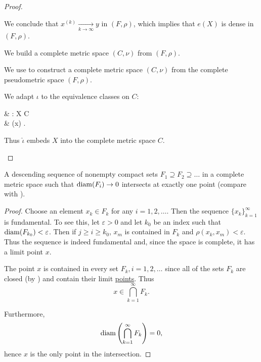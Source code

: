 \begin{proof}
\begin{thmenum}
    We conclude that \( x^{(k)} \xrightarrow[k \to \infty]{} y \) in \( (F, \rho) \), which implies that \( e(X) \) is dense in \( (F, \rho) \).

     We build a complete metric space \( (C, \nu) \) from \( (F, \rho) \).

    We use  to construct a complete metric space \( (C, \nu) \) from the complete pseudometric space \( (F, \rho) \).

    We adapt \( \iota \) to the equivalence classes on \( C \):
    \begin{balign*}
       & \hat\iota: X \to C                 \\
       & \hat\iota(x) \coloneqq [\iota(x)].
    \end{balign*}

    Thus \( \hat\iota \) embeds \( X \) into the complete metric space \( C \).
  \end{thmenum}
\end{proof}

\begin{theorem}\label{thm:cantors_nested_compact_theorem}
  A descending sequence of nonempty compact sets \( F_1 \supseteq F_2 \supseteq \ldots \) in a complete metric space such that \( \operatorname{diam}(F_i) \to 0 \) intersects at exactly one point (compare with ).
\end{theorem}
\begin{proof}
  Choose an element \( x_k \in F_k \) for any \( i = 1, 2, \ldots \). Then the sequence \( \{ x_k \}_{k=1}^\infty \) is fundamental. To see this, let \( \varepsilon > 0 \) and let \( k_0 \) be an index such that \( \operatorname{diam}(F_{k_0}) < \varepsilon \). Then if \( j \geq i \geq k_0 \), \( x_m \) is contained in \( F_k \) and \( \rho(x_k, x_m) < \varepsilon \). Thus the sequence is indeed fundamental and, since the space is complete, it has a limit point \( x \).

  The point \( x \) is contained in every set \( F_k, i = 1, 2, \ldots \) since all of the sets \( F_k \) are closed (by ) and contain their limit \hyperref[thm:limit_point_iff_in_closure]{points}. Thus
  \begin{equation*}
    x \in \bigcap_{k=1}^\infty F_k.
  \end{equation*}

  Furthermore,
  \begin{equation*}
    \operatorname{diam}\left( \bigcap_{k=1}^\infty F_k \right) = 0,
  \end{equation*}
  hence \( x \) is the only point in the intersection.
\end{proof}
